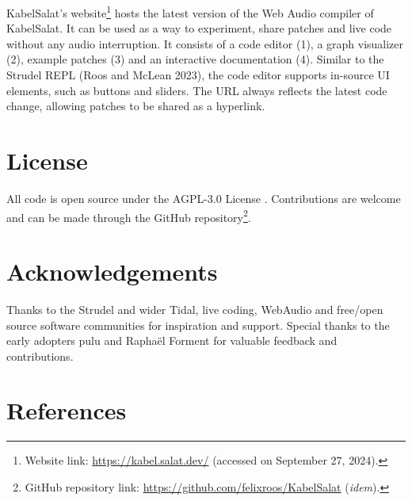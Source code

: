 \documentclass[11pt,]{article}
\begin{document}
KabelSalat's website\footnote{Website link:
  \url{https://kabel.salat.dev/} (accessed on September 27, 2024).}
hosts the latest version of the Web Audio compiler of KabelSalat. It can
be used as a way to experiment, share patches and live code without any
audio interruption. It consists of a code editor (1), a graph visualizer
(2), example patches (3) and an interactive documentation (4). Similar
to the Strudel REPL (Roos and McLean 2023), the code editor supports
in-source UI elements, such as buttons and sliders. The URL always
reflects the latest code change, allowing patches to be shared as a
hyperlink.

\section{License}\label{license}

All code is open source under the AGPL-3.0 License . Contributions are
welcome and can be made through the GitHub repository\footnote{GitHub
  repository link: \url{https://github.com/felixroos/KabelSalat}
  (\emph{idem}).}.

\section{Acknowledgements}\label{acknowledgements}

Thanks to the Strudel and wider Tidal, live coding, WebAudio and
free/open source software communities for inspiration and support.
Special thanks to the early adopters pulu and Raphaël Forment for
valuable feedback and contributions.

\newpage

\section*{References}\label{references}
\end{document}
